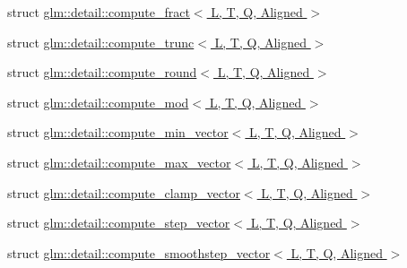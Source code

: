 \begin{DoxyCompactItemize}
\item 
struct \hyperlink{structglm_1_1detail_1_1compute__fract}{glm\+::detail\+::compute\+\_\+fract$<$ L, T, Q, Aligned $>$}
\item 
struct \hyperlink{structglm_1_1detail_1_1compute__trunc}{glm\+::detail\+::compute\+\_\+trunc$<$ L, T, Q, Aligned $>$}
\item 
struct \hyperlink{structglm_1_1detail_1_1compute__round}{glm\+::detail\+::compute\+\_\+round$<$ L, T, Q, Aligned $>$}
\item 
struct \hyperlink{structglm_1_1detail_1_1compute__mod}{glm\+::detail\+::compute\+\_\+mod$<$ L, T, Q, Aligned $>$}
\item 
struct \hyperlink{structglm_1_1detail_1_1compute__min__vector}{glm\+::detail\+::compute\+\_\+min\+\_\+vector$<$ L, T, Q, Aligned $>$}
\item 
struct \hyperlink{structglm_1_1detail_1_1compute__max__vector}{glm\+::detail\+::compute\+\_\+max\+\_\+vector$<$ L, T, Q, Aligned $>$}
\item 
struct \hyperlink{structglm_1_1detail_1_1compute__clamp__vector}{glm\+::detail\+::compute\+\_\+clamp\+\_\+vector$<$ L, T, Q, Aligned $>$}
\item 
struct \hyperlink{structglm_1_1detail_1_1compute__step__vector}{glm\+::detail\+::compute\+\_\+step\+\_\+vector$<$ L, T, Q, Aligned $>$}
\item 
struct \hyperlink{structglm_1_1detail_1_1compute__smoothstep__vector}{glm\+::detail\+::compute\+\_\+smoothstep\+\_\+vector$<$ L, T, Q, Aligned $>$}
\end{DoxyCompactItemize}
